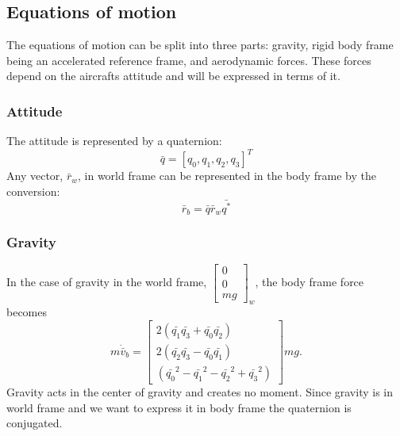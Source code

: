 \subsection{Equations of motion}

The equations of motion can be split into three parts: gravity, rigid body frame being an accelerated reference frame, and aerodynamic forces.
These forces depend on the aircrafts attitude and will be expressed in terms of it.

\subsubsection{Attitude}
The attitude is represented by a quaternion:
\begin{equation}
\bar{q} = [q_0, q_1, q_2, q_3]^T
\end{equation}
Any vector, $\bar{r}_w$, in world frame can be represented in the body frame by the conversion:
\begin{equation}
    \bar{r}_b = \bar{q} \bar{r}_w \bar{q^*}
\end{equation}

\subsubsection{Gravity}
In the case of gravity in the world frame, $\left[\begin{smallmatrix}0\\0\\mg\end{smallmatrix}\right]_w$, the body frame force becomes
\begin{equation}
m \dot{\bar{v}}_b = \left[ \begin{matrix}
    2 (\bar{q_1} \bar{q_3} + \bar{q_0} \bar{q_2})  \\
    2 (\bar{q_2} \bar{q_3} - \bar{q_0} \bar{q_1})  \\
    (\bar{q_0}^2 - \bar{q_1}^2 - \bar{q_2}^2 + \bar{q_3}^2) 
    \end{matrix} \right] m g .
\end{equation}
Gravity acts in the center of gravity and creates no moment.
Since gravity is in world frame and we want to express it in body frame the quaternion is conjugated.